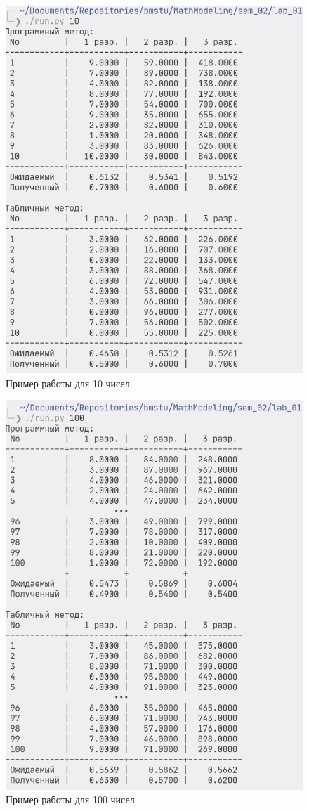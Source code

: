 \begin{figure}[htpb]
    \centering
    \includegraphics[width=0.8\linewidth]{images/scr01.png}
    \caption{Пример работы для 10 чисел}%
    \label{fig:scr01}
\end{figure}
\begin{figure}[htpb]
    \centering
    \includegraphics[width=0.8\linewidth]{images/scr02.png}
    \caption{Пример работы для 100 чисел}%
    \label{fig:scr01}
\end{figure}
